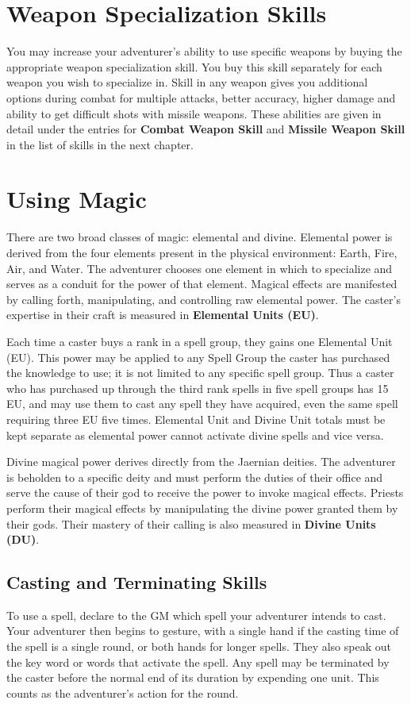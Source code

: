 
\setlength{\columnsep}{\defcolwidth}
\begin{multicols*}{2}
\section{Weapon Specialization Skills}
You may increase your adventurer's ability to use
specific weapons by buying the appropriate weapon specialization skill. You buy this skill separately for each weapon you wish to specialize in. Skill in any weapon gives you additional options during combat for multiple attacks, better accuracy, higher damage and ability to get difficult shots with missile weapons. These abilities are given in detail under the entries for \textbf{Combat Weapon Skill} and \textbf{Missile
Weapon Skill} in the list of skills in the next chapter.
\section{Using Magic}
There are two broad classes of magic: elemental
and divine. Elemental power is derived from the four elements present in the physical environment: Earth, Fire, Air, and Water. The adventurer chooses one element in which to specialize and serves as a conduit for the power of that element. Magical effects are manifested by calling forth, manipulating, and controlling raw elemental power. The caster's expertise in their craft is measured in \textbf{Elemental Units (EU)}.

Each time a caster buys a rank in a spell group, they gains one Elemental Unit (EU). This power may be applied to any Spell Group the caster has purchased the knowledge to use; it is not limited to any specific spell group. Thus a caster who has purchased up through the third rank spells in five spell groups has 15 EU, and may use them to cast any spell they have acquired, even the same spell requiring three EU five times. Elemental Unit and Divine Unit totals must be kept separate as elemental power cannot activate divine spells and vice versa.

Divine magical power derives directly from the Jaernian deities. The adventurer is beholden to a specific deity and must perform the duties of their office and serve the cause of their god to receive the power to invoke magical effects. Priests perform their magical effects by manipulating the divine power granted them by their gods. Their mastery of their calling is also measured in \textbf{Divine Units (DU)}.
\subsection{Casting and Terminating Skills}
To use a spell, declare to the GM which spell your adventurer intends to cast. Your adventurer then begins to gesture, with a single hand if the casting time of the spell is a single round, or both hands for longer spells. They also speak out the key word or words that activate the spell. Any spell may be terminated by the caster before
the normal end of its duration by expending one unit. This counts as the adventurer's action for the round.

\end{multicols*}
